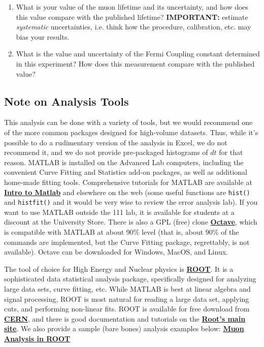 \documentclass{../lab}
\begin{document}
\begin{enumerate}
\begin{itemize}
    \end{itemize}

    \item What is your value of the muon lifetime and its uncertainty, and how does this value compare with the published lifetime? \textbf{IMPORTANT:} estimate \emph{systematic} uncertainties, i.e. think how the procedure, calibration, etc. may bias your results.

    \item What is the value and uncertainty of the Fermi Coupling constant determined in this experiment? How does this measurement compare with the published value?

\end{enumerate}

\subsection{Note on Analysis Tools}

\newpage

This analysis can be done with a variety of tools, but we would recommend one of the more common packages designed for high-volume datasets. Thus, while it's possible to do a rudimentary version of the analysis in Excel, we do not recommend it, and we do not provide pre-packaged histograms of $dt$ for that reason. MATLAB is installed on the Advanced Lab computers, including the convenient Curve Fitting and Statistics add-on packages, as well as additional home-made fitting tools. Comprehensive tutorials for MATLAB are available at \href{http://experimentationlab.berkeley.edu/matlabintro}{\textbf{Intro to Matlab}} and elsewhere on the web (some useful functions are \texttt{hist()} and \texttt{histfit()} and it would be very wise to review the error analysis lab). If you want to use MATLAB outside the 111 lab, it is available for students at a discount at the University Store. There is also a GPL (free) clone \href{http://www.gnu.org/software/octave/}{\textbf{Octave}}, which is compatible with MATLAB at about 90\% level (that is, about 90\% of the commands are implemented, but the Curve Fitting package, regrettably, is not available). Octave can be downloaded for Windows, MacOS, and Linux.

The tool of choice for High Energy and Nuclear physics is \href{http://root.cern.ch}{\textbf{ROOT}}. It is a sophisticated data statistical analysis package, specifically designed for analyzing large data sets, curve fitting, etc. While MATLAB is best at linear algebra and signal processing, ROOT is most natural for reading a large data set, applying cuts, and performing non-linear fits. ROOT is available for free download from \href{https://root.cern.ch/drupal/content/downloading-root}{\textbf{CERN}}, and there is good documentation and tutorials on the \href{http://root.cern.ch}{\textbf{Root's main site}}. We also provide a sample (bare bones) analysis examples below: \href{http://experimentationlab.berkeley.edu/node/90}{\textbf{Muon Analysis in ROOT}}
\end{document}
